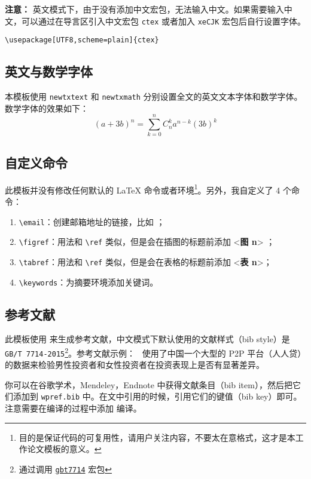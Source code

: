\documentclass[lang=cn,11pt,a4paper]{elegantpaper}
\begin{document}
\textbf{注意：} 英文模式下，由于没有添加中文宏包，无法输入中文。如果需要输入中文，可以通过在导言区引入中文宏包 \lstinline{ctex} 或者加入 \lstinline{xeCJK} 宏包后自行设置字体。 
\begin{lstlisting}
\usepackage[UTF8,scheme=plain]{ctex}
\end{lstlisting}

\subsection{英文与数学字体}

本模板使用 \lstinline{newtxtext} 和 \lstinline{newtxmath} 分别设置全文的英文文本字体和数学字体。数学字体的效果如下：
\begin{equation}
(a+3b)^{n} = \sum_{k=0}^{n} C_{n}^{k} a^{n-k} (3b)^k\label{eq:binom}
\end{equation}

\subsection{自定义命令}
此模板并没有修改任何默认的 \LaTeX{} 命令或者环境\footnote{目的是保证代码的可复用性，请用户关注内容，不要太在意格式，这才是本工作论文模板的意义。}。另外，我自定义了 4 个命令：
\begin{enumerate}
  \item \lstinline{\email}：创建邮箱地址的链接，比如 ；
  \item \lstinline{\figref}：用法和 \lstinline{\ref} 类似，但是会在插图的标题前添加 <\textbf{图 n}> ；
  \item \lstinline{\tabref}：用法和 \lstinline{\ref} 类似，但是会在表格的标题前添加 <\textbf{表 n}>；
  \item \lstinline{\keywords}：为摘要环境添加关键词。
\end{enumerate}

\subsection{参考文献}
此模板使用  来生成参考文献，中文模式下默认使用的文献样式（bib style）是 \lstinline{GB/T 7714-2015}\footnote{通过调用 \href{https://ctan.org/pkg/gbt7714}{\lstinline{gbt7714}} 宏包}。参考文献示例：~\cite{en3} 使用了中国一个大型的 P2P 平台（人人贷）的数据来检验男性投资者和女性投资者在投资表现上是否有显著差异。

你可以在谷歌学术，Mendeley，Endnote 中获得文献条目（bib item），然后把它们添加到 \lstinline{wpref.bib} 中。在文中引用的时候，引用它们的键值（bib key）即可。注意需要在编译的过程中添加  编译。
\end{document}
